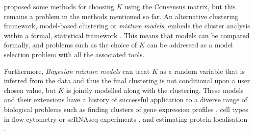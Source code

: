 \documentclass{bioinfo}
\begin{document}

\cite{monti2003consensus} proposed some methods for choosing $K$ using the Consensus matrix, but this remains a problem in the methods mentioned so far. An alternative clustering framework, model-based clustering or \emph{mixture models}, embeds the cluster analysis within a formal, statistical framework \citep{fraley2002model}. This means that models can be compared formally, and problems such as the choice of $K$ can be addressed as a model selection problem with all the associated tools. 

Furthermore, \emph{Bayesian mixture models} can treat $K$ as a random variable that is inferred from the data and thus the final clustering is not conditional upon a user chosen value, but $K$ is jointly modelled along with the clustering. These models and their extensions have a history of successful application to a diverse range of biological problems such as finding clusters of gene expression profiles \citep{medvedovic2002bayesian}, cell types in flow cytometry \citep{chan2008statistical, hejblum2019sequential} or scRNAseq experiments \citep{prabhakaran2016dirichlet}, and estimating protein localisation \citep{crook2018bayesian}.
\end{document}
